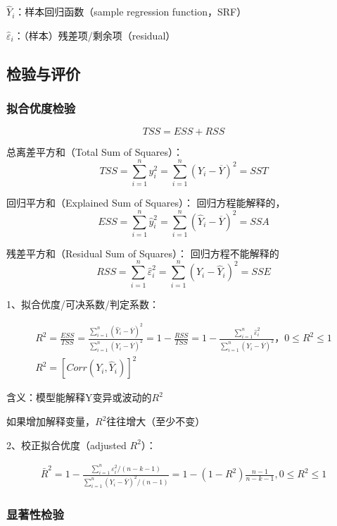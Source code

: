 \documentclass[12pt]{book}
\begin{document}
\par ${\hat{Y}}_i$：样本回归函数（sample regression function，SRF）
\par ${\hat{\varepsilon}}_i$：（样本）残差项/剩余项（residual）

\subsection{检验与评价}

\subsubsection{拟合优度检验}

$$
TSS=ESS+RSS
$$

\par 总离差平方和（Total Sum of Squares）：  
$$ TSS=\sum_{i=1}^{n}y_i^2=\sum_{i=1}^{n}\left(Y_i-\overline{Y}\right)^2=SST $$  
\par 回归平方和（Explained Sum of Squares）： 回归方程能解释的，  
$$ ESS=\sum_{i=1}^{n}{\hat{y}}_i^2=\sum_{i=1}^{n}\left({\hat{Y}}_i-\overline{Y}\right)^2=SSA $$
\par 残差平方和（Residual Sum of Squares）： 回归方程不能解释的  
$$ RSS=\sum_{i=1}^{n}{\hat{\varepsilon}}_i^2=\sum_{i=1}^{n}\left(Y_i-{\hat{Y}}_i\right)^2=SSE $$


1、拟合优度/可决系数/判定系数：

\begin{gather*}
R^2=\frac{ESS}{TSS} 
=\frac{\sum_{i=1}^{n}\left({\hat{Y}}_i-\overline{Y}\right)^2}{\sum_{i=1}^{n}\left(Y_i-\overline{Y}\right)^2} 
=1-\frac{RSS}{TSS}
=1-\frac{\sum_{i=1}^{n}{\hat{\varepsilon}}_i^2}{\sum_{i=1}^{n}\left(Y_i-\overline{Y}\right)^2}，0\leqslant R^2\leqslant 1 \\ 
R^2=\left[Corr\left(Y_i,{\hat{Y}}_i\right)\right]^2
\end{gather*}


\par 含义：模型能解释Y变异或波动的$R^2$  
\par 如果增加解释变量，$R^2$往往增大（至少不变）

2、校正拟合优度（adjusted $R^2$）：

\begin{gather*}
    {\bar{R}}^2 
=1-\frac{\sum_{i=1}^{n}{\varepsilon_i^2/(n-k-1)}}{\sum_{i=1}^{n}{(Y_i-\bar{Y})^2}/(n-1)} 
=1-(1-R^2)\frac{n-1}{n-k-1}, 0\leqslant R^2\leqslant 1
\end{gather*}


\subsubsection{显著性检验}
\end{document}
